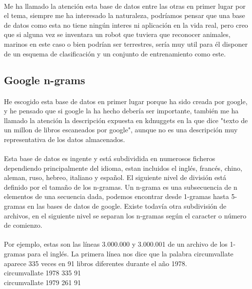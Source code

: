 \documentclass[es]{ifirak}
\begin{document}
\paragraph{}
Me ha llamado la atención esta base de datos entre las otras en primer lugar por el tema, siempre me ha interesado la naturaleza, podríamos pensar que una base de datos como esta no tiene ningún interes ni aplicación en la vida real, pero creo que si alguna vez se inventara un robot que tuviera que reconocer animales, marinos en este caso o bien podrían ser terrestres, sería muy util para él disponer de un esquema de clasificación y un conjunto de entrenamiento como este.

\subsection{Google n-grams}
\paragraph{}
He escogido esta base de datos en primer lugar porque ha sido creada por google, y he pensado que si google la ha hecho debería ser importante, también me ha llamado la atención la descripción expuesta en kdnuggets en la que dice "texto de un millon de libros escaneados por google", aunque no es una descripción muy representativa de los datos almacenados.
\paragraph{}
Esta base de datos es ingente y está subdividida en numerosos ficheros dependiendo principalmente del idioma, estan incluidos el inglés, francés, chino, aleman, ruso, hebreo, italiano y español. El siguiente nivel de división está definido por el tamaño de los n-gramas. Un n-grama es una subsecuencia de n elementos de una secuencia dada, podemos encontrar desde 1-gramas hasta 5-gramas en las bases de datos de google. Existe todavía otra subdivisión de archivos, en el siguiente nivel se separan los n-gramas según el caracter o número de comienzo.

\paragraph{}
Por ejemplo, estas son las líneas 3.000.000 y 3.000.001 de un archivo de los 1-gramas para el inglés. La primera línea nos dice que la palabra circumvallate aparece 335 veces en 91 libros diferentes durante el año 1978.\\
circumvallate   \hspace{0.7cm}1978   \hspace{0.7cm}335 \hspace{0.7cm}   91\\
circumvallate   \hspace{0.7cm}1979 \hspace{0.7cm}261  \hspace{0.7cm}  91 
\end{document}
